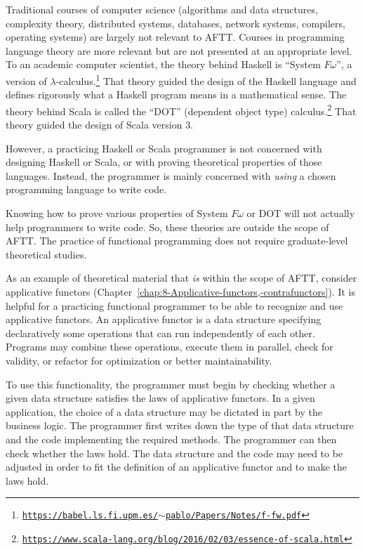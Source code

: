 Traditional courses of computer science (algorithms and data structures,
complexity theory, distributed systems, databases, network systems,
compilers, operating systems) are largely not relevant to AFTT. Courses
in programming language theory are more relevant but are not presented
at an appropriate level. To an academic computer scientist, the theory
behind Haskell is \textsf{``}System $F\omega$\textsf{''}, a version of $\lambda$-calculus.\footnote{\texttt{\href{https://babel.ls.fi.upm.es/~pablo/Papers/Notes/f-fw.pdf}{https://babel.ls.fi.upm.es/$\sim$pablo/Papers/Notes/f-fw.pdf}}}
That theory guided the design of the Haskell language and defines
rigorously what a Haskell program means in a mathematical sense. The
theory behind Scala is called the \textsf{``}DOT\textsf{''} (dependent object type)
calculus.\footnote{\texttt{\href{https://www.scala-lang.org/blog/2016/02/03/essence-of-scala.html}{https://www.scala-lang.org/blog/2016/02/03/essence-of-scala.html}}}
That theory guided the design of Scala version 3.

However, a practicing Haskell or Scala programmer is not concerned
with designing Haskell or Scala, or with proving theoretical properties
of those languages. Instead, the programmer is mainly concerned with
\emph{using} a chosen programming language to write code. 

Knowing how to prove various properties of System $F\omega$ or DOT
will not actually help programmers to write code. So, these theories
are outside the scope of AFTT. The practice of functional programming
does not require graduate-level theoretical studies.

As an example of theoretical material that \emph{is} within the scope
of AFTT, consider applicative functors (Chapter~\ref{chap:8-Applicative-functors,-contrafunctors}).
It is helpful for a practicing functional programmer to be able to
recognize and use applicative functors. An applicative functor is
a data structure specifying declaratively some operations that can
run independently of each other. Programs may combine these operations,
execute them in parallel, check for validity, or refactor for optimization
or better maintainability.

To use this functionality, the programmer must begin by checking whether
a given data structure satisfies the laws of applicative functors.
In a given application, the choice of a data structure may be dictated
in part by the business logic. The programmer first writes down the
type of that data structure and the code implementing the required
methods. The programmer can then check whether the laws hold. The
data structure and the code may need to be adjusted in order to fit
the definition of an applicative functor and to make the laws hold.


